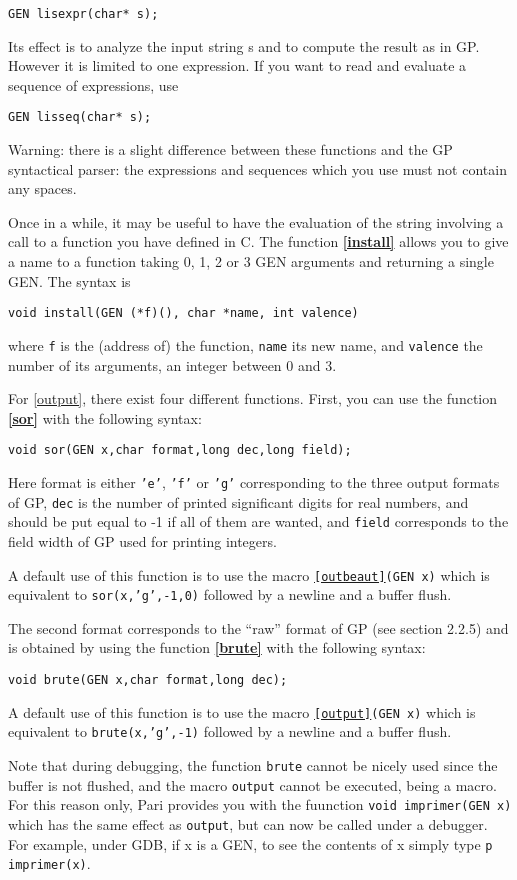 {\tt GEN lisexpr(char* s);}

Its effect is to analyze the input string s and to compute the result as in GP.
However it is limited to one expression. If you want to read and evaluate
a sequence of expressions, use

{\tt GEN lisseq(char* s);}

Warning: there is a slight difference between these functions and the GP
syntactical parser: the expressions and sequences which you use must not
contain any spaces.

Once in a while, it may be useful to have the evaluation of the string
involving
a call to a function you have defined in C. The function {\bf \ref{install}}
allows you to give a name to a function taking 0, 1, 2 or 3 GEN arguments and
returning a single GEN. The syntax is 

{\tt void install(GEN (*f)(), char *name, int valence)}

where {\tt f} is the (address of) the function, {\tt name} its new name, and
{\tt valence} the number of its arguments, an integer between 0 and 3.

For \ref{output}, there exist four different functions. First, you can
use the function {\bf \ref{sor}} with the following syntax:

{\tt void sor(GEN x,char format,long dec,long field);}

Here format is either {\tt 'e'}, {\tt 'f'} or {\tt 'g'} corresponding to
the three output formats of GP, {\tt dec} is the number of printed significant
digits for real numbers, and should be put equal to -1 if all of them are
wanted, and {\tt field} corresponds to the field width of GP used for printing
integers.

A default use of this function is to use the macro {\tt \ref{outbeaut}(GEN x)}
which is equivalent to {\tt sor(x,'g',-1,0)} followed by a newline and a
buffer flush.

The second format corresponds to the ``raw'' format of GP (see section 2.2.5)
and is obtained by using the function {\bf \ref{brute}} with the following 
syntax:

{\tt void brute(GEN x,char format,long dec);}

A default use of this function is to use the macro {\tt \ref{output}(GEN x)} 
which is equivalent to {\tt brute(x,'g',-1)} followed by a newline and a 
buffer flush.

Note that during debugging, the function {\tt brute} cannot be nicely used
since the buffer is not flushed, and the macro {\tt output} cannot be 
executed, being a macro. For this reason only, Pari provides you with the
fuunction {\tt void imprimer(GEN x)} which has the same effect as {\tt output},
but can now be called under a debugger. For example, under GDB, if x is a GEN,
to see the contents of x simply type {\tt p imprimer(x)}.

